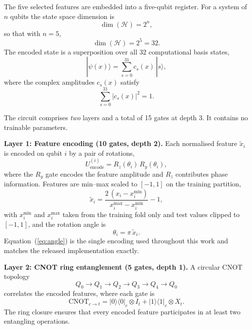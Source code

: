 \documentclass{ws-ijqi}
\begin{document}
The five selected features are embedded into a five-qubit register. For a
system of $n$ qubits the state space dimension is
\begin{equation}
\dim(\mathcal{H}) = 2^{n},
\label{eq:dim}
\end{equation}
so that with $n=5$,
\begin{equation}
\dim(\mathcal{H}) = 2^{5} = 32 .
\label{eq:dim32}
\end{equation}
The encoded state is a superposition over all 32 computational basis states,
\begin{equation}
|\psi(x)\rangle = \sum_{s=0}^{31} c_s(x)\,|s\rangle ,
\label{eq:state}
\end{equation}
where the complex amplitudes $c_s(x)$ satisfy
\begin{equation}
\sum_{s=0}^{31} |c_s(x)|^2 = 1 .
\label{eq:norm}
\end{equation}

The circuit comprises \emph{two} layers and a total of 15 gates at depth 3. It
contains no trainable parameters.

\vspace{4pt}
\noindent\textbf{Layer 1: Feature encoding (10 gates, depth 2).}
Each normalised feature $\tilde{x}_i$ is encoded on qubit $i$ by a pair of
rotations,
\begin{equation}
U^{(i)}_{\mathrm{encode}} = R_z(\theta_i)\,R_y(\theta_i),
\label{eq:encode}
\end{equation}
where the $R_y$ gate encodes the feature amplitude and $R_z$ contributes phase
information. Features are min--max scaled to $[-1,1]$ on the training partition,
\begin{equation}
\tilde{x}_i = \frac{2\,(x_i - x_i^{\min})}{x_i^{\max} - x_i^{\min}} - 1 ,
\label{eq:scale}
\end{equation}
with $x_i^{\min}$ and $x_i^{\max}$ taken from the training fold only and test
values clipped to $[-1,1]$, and the rotation angle is
\begin{equation}
\theta_i = \pi\,\tilde{x}_i .
\label{eq:angle}
\end{equation}
Equation~(\ref{eq:angle}) is the single encoding used throughout this work and
matches the released implementation exactly.

\vspace{4pt}
\noindent\textbf{Layer 2: CNOT ring entanglement (5 gates, depth 1).}
A circular CNOT topology
\[
Q_0 \rightarrow Q_1 \rightarrow Q_2 \rightarrow Q_3 \rightarrow Q_4 \rightarrow Q_0
\]
correlates the encoded features, where each gate is
\begin{equation}
\mathrm{CNOT}_{c\to t} = |0\rangle\langle 0|_c \otimes I_t
                       + |1\rangle\langle 1|_c \otimes X_t .
\label{eq:cnot}
\end{equation}
The ring closure ensures that every encoded feature participates in at least
two entangling operations.
\end{document}
